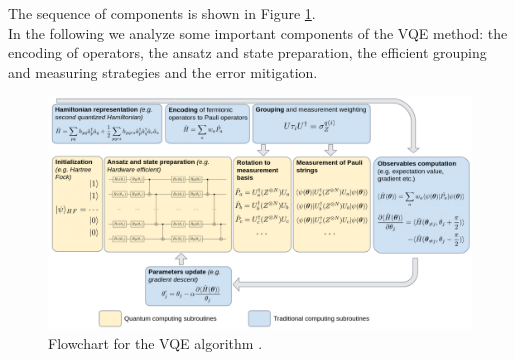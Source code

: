 The sequence of components is shown in Figure \ref{VQE scheme}. \\
In the following we analyze some important components of the VQE method: the encoding of operators, the ansatz and state preparation, the efficient grouping and measuring strategies and the error mitigation.
\begin{figure}[ht]
  \centering
  \includegraphics[width=\textwidth]{figures/VQE scheme.png}
  \caption{Flowchart for the VQE algorithm \cite{Tilly2021Nov}.} \label{VQE scheme}
\end{figure}

